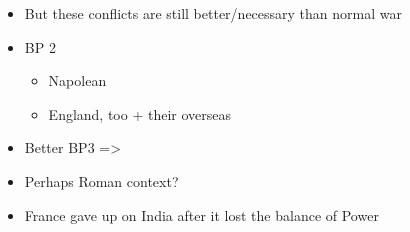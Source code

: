 \documentclass[letterpaper]{article}
\begin{document}
\begin{itemize}
\item But these conflicts are still better/necessary than normal war

\item BP 2

\begin{itemize}
\item Napolean
\item England, too + their overseas
\end{itemize}

\item Better BP3 =>

\item Perhaps Roman context?

\item France gave up on India after it lost the balance of Power
\end{itemize}
\end{document}

